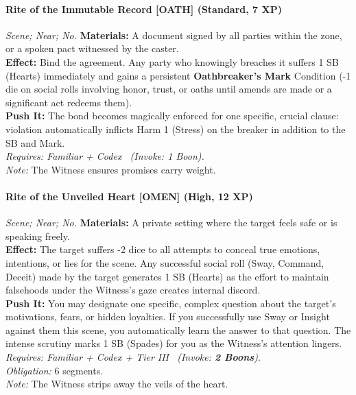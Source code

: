 \paragraph{Rite of the Immutable Record [OATH] (Standard, 7 XP)} \emph{Scene; Near; No.}
\textbf{Materials:} A document signed by all parties within the zone, or a spoken pact witnessed by the caster. \\
\textbf{Effect:} Bind the agreement. Any party who knowingly breaches it suffers 1 SB (Hearts) immediately and gains a persistent \textbf{Oathbreaker's Mark} Condition (-1 die on social rolls involving honor, trust, or oaths until amends are made or a significant act redeems them). \\
\textbf{Push It:} The bond becomes magically enforced for one specific, crucial clause: violation automatically inflicts Harm 1 (Stress) on the breaker in addition to the SB and Mark. \\
\emph{Requires: Familiar + Codex \ (\textit{Invoke:} 1 Boon).} \\
\emph{Note:} The Witness ensures promises carry weight. %

\paragraph{Rite of the Unveiled Heart [OMEN] (High, 12 XP)} \emph{Scene; Near; No.}
\textbf{Materials:} A private setting where the target feels safe or is speaking freely. \\
\textbf{Effect:} The target suffers -2 dice to all attempts to conceal true emotions, intentions, or lies for the scene. Any successful social roll (Sway, Command, Deceit) made by the target generates 1 SB (Hearts) as the effort to maintain falsehoods under the Witness's gaze creates internal discord. \\
\textbf{Push It:} You may designate one specific, complex question about the target's motivations, fears, or hidden loyalties. If you successfully use Sway or Insight against them this scene, you automatically learn the answer to that question. The intense scrutiny marks 1 SB (Spades) for you as the Witness's attention lingers. \\
\emph{Requires: Familiar + Codex + Tier III \ (\textit{Invoke:} \textbf{2 Boons}).} \\
\emph{Obligation:} 6 segments. \\
\emph{Note:} The Witness strips away the veils of the heart. %

